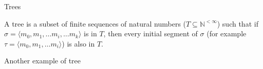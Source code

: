 \documentclass{beamer} %
\begin{document}
\begin{frame}{Trees}
    \begin{definition}
        A tree is a subset of finite sequences of natural numbers ($T \subseteq \mathbb{N}^{<\infty}$) such that 
        if $\sigma = \langle m_0, m_1, \dots m_i, \dots m_k \rangle$ is in $T$, then every initial segment of $\sigma$ 
        (for example $\tau = \langle m_0, m_1, \dots m_i \rangle$) is also in $T$.
    \end{definition}
    \pause
    \begin{figure}
    \end{figure}
\end{frame}

\begin{frame}{Another example of tree}
    \begin{figure}
    \end{figure}    
\end{frame}
\end{document}

